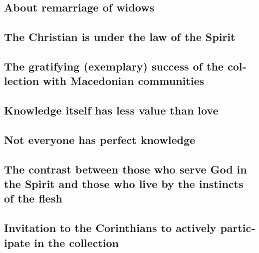 \begin{paracol}{2}
\begin{otherlanguage}{english}
\hypertarget{about-remarriage-of-widows}{%
\subsection{About remarriage of
widows}\label{about-remarriage-of-widows}}

\hypertarget{the-christian-is-under-the-law-of-the-spirit}{%
\subsection{The Christian is under the law of the
Spirit}\label{the-christian-is-under-the-law-of-the-spirit}}

\hypertarget{the-gratifying-exemplary-success-of-the-collection-with-macedonian-communities}{%
\subsection{The gratifying (exemplary) success of the collection with
Macedonian
communities}\label{the-gratifying-exemplary-success-of-the-collection-with-macedonian-communities}}

\hypertarget{knowledge-itself-has-less-value-than-love}{%
\subsection{Knowledge itself has less value than
love}\label{knowledge-itself-has-less-value-than-love}}

\hypertarget{not-everyone-has-perfect-knowledge}{%
\subsection{Not everyone has perfect
knowledge}\label{not-everyone-has-perfect-knowledge}}

\hypertarget{the-contrast-between-those-who-serve-god-in-the-spirit-and-those-who-live-by-the-instincts-of-the-flesh}{%
\subsection{The contrast between those who serve God in the Spirit and
those who live by the instincts of the
flesh}\label{the-contrast-between-those-who-serve-god-in-the-spirit-and-those-who-live-by-the-instincts-of-the-flesh}}

\hypertarget{invitation-to-the-corinthians-to-actively-participate-in-the-collection}{%
\subsection{Invitation to the Corinthians to actively participate in the
collection}\label{invitation-to-the-corinthians-to-actively-participate-in-the-collection}}


\end{otherlanguage}
\end{paracol}
